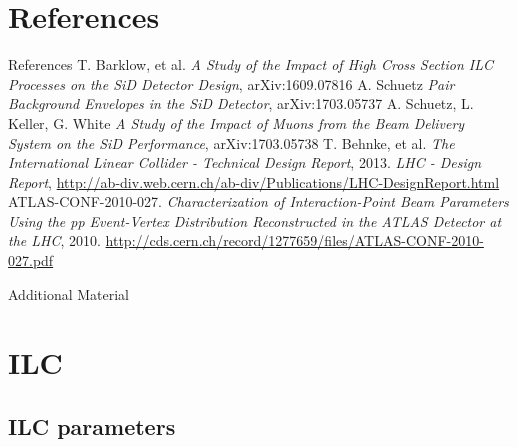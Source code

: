 \documentclass[xcolor={dvipsnames}]{beamer}
\begin{document}
\section*{References}
\begin{thebibliography}{9}
\begin{frame}{References}
 T. Barklow, et al. \emph{A Study of the Impact of High Cross Section ILC Processes on the SiD Detector Design}, arXiv:1609.07816
 A. Schuetz \emph{Pair Background Envelopes in the SiD Detector}, arXiv:1703.05737
 A. Schuetz, L. Keller, G. White \emph{A Study of the Impact of Muons from the Beam Delivery System on the SiD Performance}, arXiv:1703.05738
 T. Behnke, et al.
\emph{The International Linear Collider - Technical Design Report}, 2013.
 \emph{LHC - Design Report}, \url{http://ab-div.web.cern.ch/ab-div/Publications/LHC-DesignReport.html}
 ATLAS-CONF-2010-027. \emph{Characterization of Interaction-Point Beam Parameters Using the pp Event-Vertex Distribution Reconstructed in the ATLAS Detector at the LHC}, 2010. \url{http://cds.cern.ch/record/1277659/files/ATLAS-CONF-2010-027.pdf}
\end{frame}
\end{thebibliography}

\endgroup
\begingroup 
\appendix
\newif\iflattersubsect

\begin{frame}
\begin{center}
\LARGE Additional Material
\end{center}
  \tableofcontents
\end{frame}

\section{ILC}
\subsection{ILC parameters}
\end{document}

